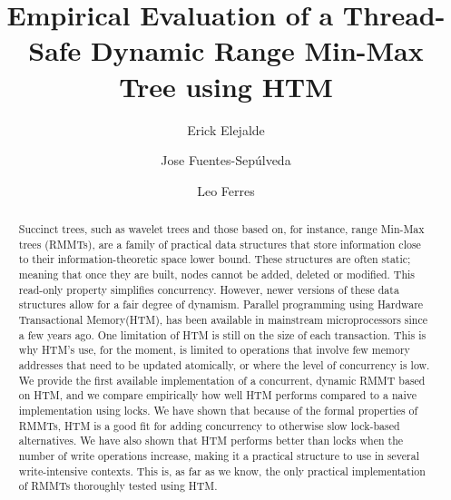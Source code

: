 \documentclass{llncs}
\begin{document}
\title{Empirical Evaluation of a Thread-Safe Dynamic Range Min-Max Tree using HTM}
  \author{Erick Elejalde \and Jose Fuentes-Sep{\'{u}}lveda \and Leo Ferres}
 


\maketitle              

\begin{abstract}
Succinct trees, such as wavelet trees and those based on, for instance, range
Min-Max trees (RMMTs), are a family of practical data structures that store information close to their information-theoretic space lower bound.
These structures are often static; meaning that once they are built, nodes cannot be
added, deleted or modified. This read-only property simplifies concurrency. However,
newer versions of these data structures allow for a fair degree of dynamism.
Parallel programming using Hardware Transactional Memory(HTM), has been
available in mainstream microprocessors since a few years ago. One limitation of HTM is still on the size
of each transaction. This is why HTM's use, for the moment, is limited to operations that involve few
memory addresses that need to be updated atomically, or where the level of concurrency
is low. We provide the first available implementation of a concurrent, dynamic RMMT based on HTM, and we compare
empirically how well HTM performs compared to a naive implementation using locks.
We have shown that because of the formal properties of RMMTs, HTM is a good fit for
adding concurrency to otherwise slow lock-based alternatives. We have also shown that HTM performs better than locks when the number of write operations increase, making
it a practical structure to use in several write-intensive contexts.
This is, as far as we know, the only practical implementation of RMMTs thoroughly tested using HTM.
\end{abstract}
\vspace{-4mm}
\end{document}
